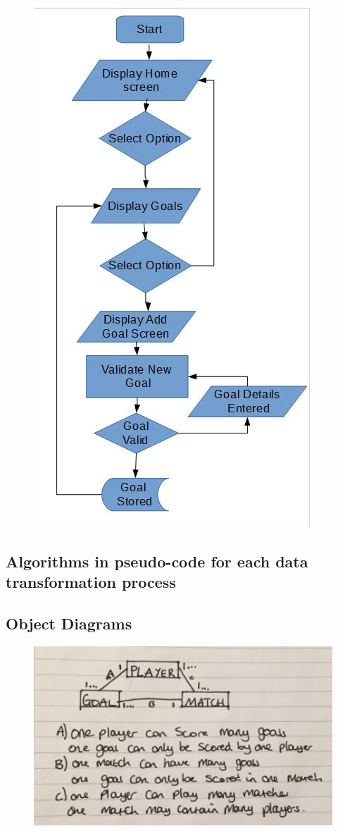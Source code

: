 \begin{figure}[H]
	\includegraphics{goalsFc}

\end{figure}
\subsection{Algorithms in pseudo-code for each data transformation process}

\subsection{Object Diagrams}
\begin{figure}[H]
	\includegraphics[width=150mm]{objectDiagram}
\end{figure}

